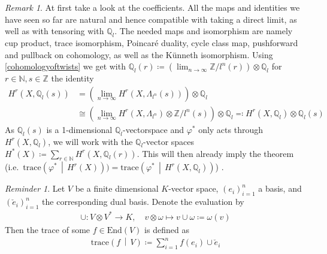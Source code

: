 \documentclass[english]{scrartcl}
\theoremstyle{definition}
\theoremstyle{remark}
\newtheorem{Rem}[Def]{Remark}
\newtheorem{Rev}[Def]{Reminder}
\newcommand*{\N}{\mathds{N}}
\newcommand*{\Z}{\mathds{Z}}
\newcommand*{\Q}{\mathds{Q}}
\newcommand*{\Zmod}[1]{\Z/#1} %
\newcommand*{\Zl}{\Z_l} %
\newcommand*{\Ql}{\Q_l} %
\newcommand*{\End}[1]{\text{End}(#1)} %
\newcommand*{\idest}{i.e.\ }
\newcommand*{\M}{\Lambda}
\newcommand*{\trace}[2]{{\text{trace}\left(#1 \,\middle|\, #2 \right)}} %
\renewcommand*{\phi}{\varphi}
\begin{document}
\begin{Rem}
  At first take a look at the coefficients.
  All the maps and identities we have seen so far are natural and
  hence compatible with  taking a direct limit, as well as with
  tensoring with $\Ql$.
  The needed maps and isomorphism are namely
  cup product,
  trace isomorphism,
  Poincaré duality,
  cycle class map,
  pushforward and pullback on cohomology, as well as
  the Künneth isomorphism.
  Using  \ref{cohomologyoftwists} we get with
  $\Ql(r)\coloneqq\left(\lim_{n\to\infty}\Zmod{l^n}(r)\right)\otimes\Ql$
  for $r\in\N,s\in\Z$ the identity
  \begin{align*}
    H^r(X,\Ql(s)) &=
    \left(\lim_{n\to\infty} H^r(X,\M_{l^n}(s))\right) \otimes \Ql\\
    &\cong
    \left(\lim_{n\to\infty} H^r(X,\M_{l^n})\otimes \Zmod{l^n}(s)\right)\otimes\Ql
    \eqqcolon H^r(X,\Ql)\otimes\Ql(s)
  \end{align*}
  As $\Ql(s)$ is a 1-dimensional $\Ql$-vectorspace and $\phi^*$ only
  acts through $H^r(X,\Ql)$, we will work with the $\Ql$-vector spaces
  $H^*(X)\coloneqq\sum_{r\in\N} H^r(X, \Ql(r))$. This will then
  already imply the theorem
  (\idest $\trace{\phi^*}{H^r(X)})=\trace{\phi^*}{H^r(X,\Ql)}$)
  \cite[][Rem.~I.25.5]{milne}.
\end{Rem}

\begin{Rev}
  Let $V$ be a finite dimensional $K$-vector space, $(e_i)_{i=1}^n$ a basis,
  and $(\check e_i)_{i=1}^n$ the corresponding dual basis.
  Denote the evaluation by
  \begin{align*}
    \cup\colon V\otimes V^* \to K,\quad
    v\otimes \omega \mapsto v\cup\omega\coloneqq \omega(v)
  \end{align*}
  Then the trace of some $f\in\End{V}$ is defined as
  \begin{gather*}
    \trace{f}{V} \coloneqq \sum_{i=1}^n f(e_i)\cup \check e_i
  \end{gather*}
\end{Rev}
\end{document}

